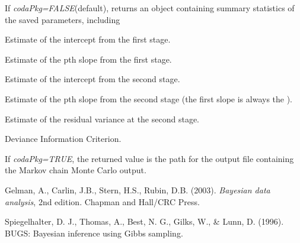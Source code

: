 \documentclass[a4paper]{book}
\begin{document}
%
\begin{Value}
If \emph{codaPkg=FALSE}(default), returns an object containing summary statistics of
the saved parameters, including
\begin{ldescription}
\item[\code{s1.intercept}] Estimate of the intercept from the first stage.
\item[\code{s1.slopeP}] Estimate of the pth slope from the first stage. 
\item[\code{s2.intercept}] Estimate of the intercept from the second stage.
\item[\code{s2.slopeP}] Estimate of the pth slope from the second stage (the first slope is always
the ).
\item[\code{var.e.s2}] Estimate of the residual variance at the second stage.
\item[\code{DIC}] Deviance Information Criterion.
\end{ldescription}
If \emph{codaPkg=TRUE}, the returned value is the path for the output file
containing the Markov chain Monte Carlo output.
\end{Value}
%
\begin{References}\relax
Gelman, A., Carlin, J.B., Stern, H.S., Rubin, D.B. (2003).
\emph{Bayesian data analysis}, 2nd edition. Chapman and Hall/CRC Press.

Spiegelhalter, D. J., Thomas, A., Best, N. G., Gilks, W., \& Lunn, D. (1996).
BUGS: Bayesian inference using Gibbs sampling.
\end{References}
%
\begin{Examples}
\end{Examples}
\end{document}
